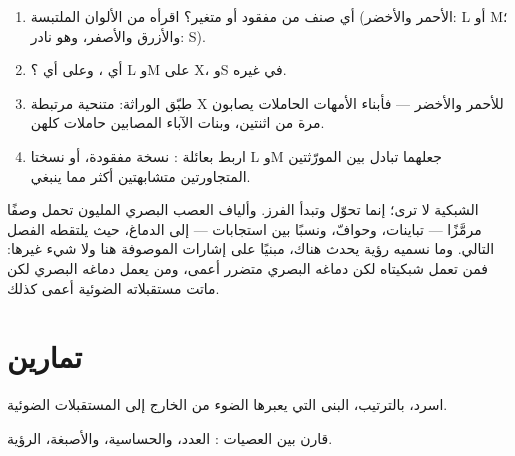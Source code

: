 \begin{method}\label{met:g11:the-eye:case}
\begin{enumerate}
  \item أي صنف من  مفقود أو متغير؟ اقرأه من الألوان الملتبسة
        (الأحمر والأخضر: L أو M؛ والأزرق والأصفر، وهو نادر: S).
  \item أي ، وعلى أي ؟ L وM على  X، وS في غيره.
  \item طبّق الوراثة: متنحية مرتبطة  X للأحمر والأخضر ---
        فأبناء الأمهات الحاملات يصابون مرة من اثنتين، وبنات الآباء
        المصابين حاملات كلهن.
  \item اربط بعائلة : نسخة مفقودة، أو نسختا L وM جعلهما تبادل
        بين المورّثتين المتجاورتين متشابهتين أكثر مما ينبغي.
\end{enumerate}
\end{method}

\begin{remark}\label{rem:g11:the-eye:tobrain}
الشبكية لا ترى؛ إنما تحوّل وتبدأ الفرز. وألياف العصب البصري المليون
تحمل وصفًا مرمَّزًا --- تباينات، وحوافّ، ونسبًا بين استجابات 
--- إلى الدماغ، حيث يلتقطه الفصل التالي. وما نسميه رؤية يحدث هناك،
مبنيًا على إشارات  الموصوفة هنا ولا شيء غيرها: فمن تعمل شبكيتاه
لكن دماغه البصري متضرر أعمى، ومن يعمل دماغه البصري لكن ماتت مستقبلاته
الضوئية أعمى كذلك.
\end{remark}

\section{تمارين}

\begin{exercise}[$\star$]\label{exo:g11:the-eye:1}
اسرد، بالترتيب، البنى التي يعبرها الضوء من الخارج إلى المستقبلات
الضوئية.
\end{exercise}

\begin{exercise}[$\star$]\label{exo:g11:the-eye:2}
قارن بين العصيات : العدد، والحساسية، والأصبغة،  الرؤية.
\end{exercise}

